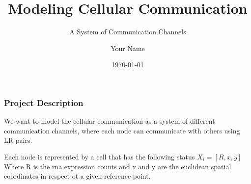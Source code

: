 \documentclass[10pt]{beamer}
\begin{document}
\begin{frame}
    \title{Modeling Cellular Communication}
    \subtitle{A System of Communication Channels}
    \author{Your Name}
    \date{\today}
    \maketitle

\end{frame}
\begin{frame}
    \frametitle{Project Description}
    \begin{alertblock}{}
        We want to model the cellular communication as a system of different communication channels,
        where each node can communicate with others using LR pairs.
    \end{alertblock}

    \begin{alertblock}{}
        Each node is represented by a cell that has the following status $X_i = [R, x, y]$
        Where R is the rna expression counts and x and y are the euclidean spatial coordinates in
        respect ot a given reference point.
    \end{alertblock}
\end{frame}
\end{document}
